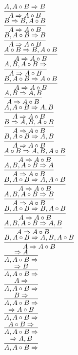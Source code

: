 \documentclass[11pt]{article}
\begin{document}
\begin{center}
\bigskip
\\$\infer{A\Rightarrow A\circ B}{A, A\circ B\Rightarrow B}$
\bigskip
\\$\infer{A\Rightarrow A\circ B}{B\Rightarrow B, A\circ B}$
\bigskip
\\$\infer{A\Rightarrow A\circ B}{B, A\circ B\Rightarrow B}$
\bigskip
\\$\infer{A\Rightarrow A\circ B}{A\circ B\Rightarrow B, A\circ B}$
\bigskip
\\$\infer{A\Rightarrow A\circ B}{A, B, A\circ B\Rightarrow }$
\bigskip
\\$\infer{A\Rightarrow A\circ B}{B, A\circ B\Rightarrow A\circ B}$
\bigskip
\\$\infer{A\Rightarrow A\circ B}{A, B\Rightarrow A, B}$
\bigskip
\\$\infer{A\Rightarrow A\circ B}{A, A\circ B\Rightarrow A, B}$
\bigskip
\\$\infer{A\Rightarrow A\circ B}{B\Rightarrow A, B, A\circ B}$
\bigskip
\\$\infer{A\Rightarrow A\circ B}{B, A\circ B\Rightarrow A, B}$
\bigskip
\\$\infer{A\Rightarrow A\circ B}{A\circ B\Rightarrow A, B, A\circ B}$
\bigskip
\\$\infer{A\Rightarrow A\circ B}{A, B, A\circ B\Rightarrow A}$
\bigskip
\\$\infer{A\Rightarrow A\circ B}{B, A\circ B\Rightarrow A, A\circ B}$
\bigskip
\\$\infer{A\Rightarrow A\circ B}{A, B, A\circ B\Rightarrow B}$
\bigskip
\\$\infer{A\Rightarrow A\circ B}{B, A\circ B\Rightarrow B, A\circ B}$
\bigskip
\\$\infer{A\Rightarrow A\circ B}{A, B, A\circ B\Rightarrow A, B}$
\bigskip
\\$\infer{A\Rightarrow A\circ B}{B, A\circ B\Rightarrow A, B, A\circ B}$
\bigskip
\\$\infer{A, A\circ B\Rightarrow }{\Rightarrow A}$
\bigskip
\\$\infer{A, A\circ B\Rightarrow }{\Rightarrow B}$
\bigskip
\\$\infer{A, A\circ B\Rightarrow }{A\Rightarrow }$
\bigskip
\\$\infer{A, A\circ B\Rightarrow }{B\Rightarrow }$
\bigskip
\\$\infer{A, A\circ B\Rightarrow }{\Rightarrow A\circ B}$
\bigskip
\\$\infer{A, A\circ B\Rightarrow }{A\circ B\Rightarrow }$
\bigskip
\\$\infer{A, A\circ B\Rightarrow }{\Rightarrow A, B}$

\end{center}
\end{document}
